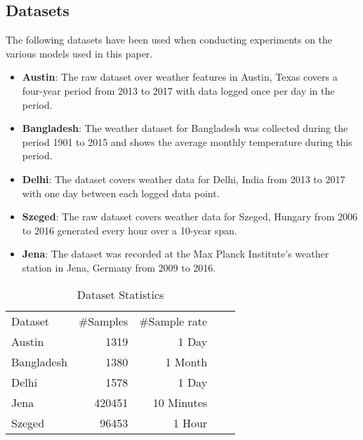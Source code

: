 \subsection{Datasets}
The following datasets have been used when conducting experiments on the various models used in this paper.
\begin{itemize}
    \item \textbf{Austin}\cite{HistoricalHourlyWeather}: The raw dataset over weather features in Austin, Texas covers a four-year period from 2013 to 2017 with data logged once per day in the period.
    \item \textbf{Bangladesh}\cite{BangladeshWeatherDataset}: The weather dataset for Bangladesh was collected during the period 1901 to 2015 and shows the average monthly temperature during this period. 
    \item \textbf{Delhi}\cite{DailyClimateTime}: The dataset covers weather data for Delhi, India from 2013 to 2017 with one day between each logged data point.
    \item \textbf{Szeged}\cite{WeatherSzeged}: The raw dataset covers weather data for Szeged, Hungary from 2006 to 2016 generated every hour over a 10-year span.
    \item \textbf{Jena}\cite{WeatherArchiveJena}: The dataset was recorded at the Max Planck Institute's weather station in Jena, Germany from 2009 to 2016.
\end{itemize}

\begin{table*}[!ht]
\centering
\caption {Dataset Statistics} \label{tab:DatasetTable}
\begin{tabular}{|l|r|r|ll}
\cline{1-3}
Dataset    & \multicolumn{1}{l|}{\#Samples} & \multicolumn{1}{l|}{\#Sample rate} &  &  \\ \cline{1-3}
Austin     & 1319                           & 1 Day                              &  &  \\ \cline{1-3}
Bangladesh & 1380                           & 1 Month                            &  &  \\ \cline{1-3}
Delhi      & 1578                           & 1 Day                              &  &  \\ \cline{1-3}
Jena       & 420451                         & 10 Minutes                         &  &  \\ \cline{1-3}
Szeged     & 96453                          & 1 Hour                             &  &  \\ \cline{1-3}
\end{tabular}
\end{table*}

